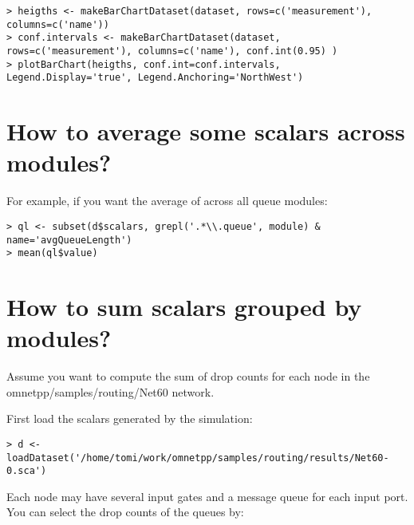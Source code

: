 \begin{verbatim}
> heigths <- makeBarChartDataset(dataset, rows=c('measurement'), columns=c('name'))
> conf.intervals <- makeBarChartDataset(dataset, rows=c('measurement'), columns=c('name'), conf.int(0.95) )
> plotBarChart(heigths, conf.int=conf.intervals, Legend.Display='true', Legend.Anchoring='NorthWest')
\end{verbatim}

\section{How to average some scalars across modules?}

For example, if you want the average of  across all queue modules:

\begin{verbatim}
> ql <- subset(d$scalars, grepl('.*\\.queue', module) & name='avgQueueLength')
> mean(ql$value)
\end{verbatim}

\section{How to sum scalars grouped by modules?}

Assume you want to compute the sum of drop counts for each node in the
omnetpp/samples/routing/Net60 network.

First load the scalars generated by the simulation:

\begin{verbatim}
> d <- loadDataset('/home/tomi/work/omnetpp/samples/routing/results/Net60-0.sca')
\end{verbatim}

Each node may have several input gates and a message queue for each input port.
You can select the drop counts of the queues by:

